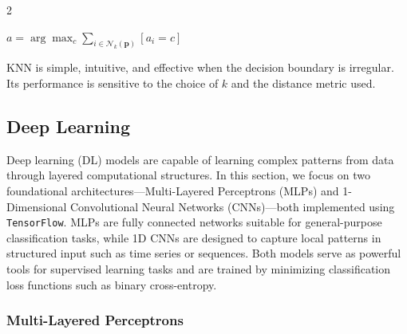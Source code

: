 \documentclass[bst/sn-nature]{sn-jnl}
\begin{document}
\begin{multicols}{2}
\begin{center}
    $a = \arg\max_{c} \sum_{i \in \mathcal{N}_k(\mathbf{p})} [a_i = c]$ \vspace{0.3cm}
\end{center}

KNN is simple, intuitive, and effective when the decision boundary is irregular. Its performance is sensitive to the choice of $k$ and the distance metric used.

\subsection{Deep Learning}

\quad Deep learning (DL) models are capable of learning complex patterns from data through layered computational structures. In this section, we focus on two foundational architectures—Multi-Layered Perceptrons (MLPs) and 1-Dimensional Convolutional Neural Networks (CNNs)—both implemented using \texttt{TensorFlow\cite{tensorflow}}. MLPs are fully connected networks suitable for general-purpose classification tasks, while 1D CNNs are designed to capture local patterns in structured input such as time series or sequences. Both models serve as powerful tools for supervised learning tasks and are trained by minimizing classification loss functions such as binary cross-entropy.

\subsubsection{Multi-Layered Perceptrons\cite{nndesign}}


\end{multicols}
\end{document}

